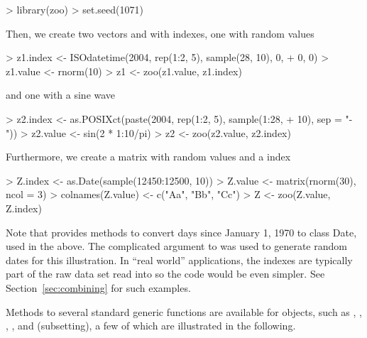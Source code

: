 \documentclass{Z}
\begin{document}
\begin{Schunk}
\begin{Sinput}
> library(zoo)
> set.seed(1071)
\end{Sinput}
\end{Schunk}

Then, we create two vectors  and  with  
indexes, one with random values
\begin{Schunk}
\begin{Sinput}
> z1.index <- ISOdatetime(2004, rep(1:2, 5), sample(28, 10), 0, 
+     0, 0)
> z1.value <- rnorm(10)
> z1 <- zoo(z1.value, z1.index)
\end{Sinput}
\end{Schunk}
and one with a sine wave
\begin{Schunk}
\begin{Sinput}
> z2.index <- as.POSIXct(paste(2004, rep(1:2, 5), sample(1:28, 
+     10), sep = "-"))
> z2.value <- sin(2 * 1:10/pi)
> z2 <- zoo(z2.value, z2.index)
\end{Sinput}
\end{Schunk}
Furthermore, we create a matrix  with random values and a 
index
\begin{Schunk}
\begin{Sinput}
> Z.index <- as.Date(sample(12450:12500, 10))
> Z.value <- matrix(rnorm(30), ncol = 3)
> colnames(Z.value) <- c("Aa", "Bb", "Cc")
> Z <- zoo(Z.value, Z.index)
\end{Sinput}
\end{Schunk}
Note that  provides  methods to convert days 
since January 1, 1970 to class Date, used in the above.
The complicated argument to 
was used to generate random 
dates for this illustration. In ``real world'' applications, the indexes
are typically part of the raw data set read into  so the
code would be even simpler. See Section~\ref{sec:combining}
for such examples.

Methods to several standard generic functions are available for
 objects, such as , , , ,
 and \code{[} (subsetting), a few of which are illustrated in
the following. 
\end{document}
